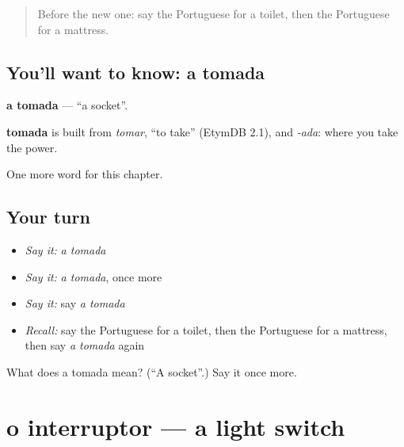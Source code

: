 \label{lesson:PT-C229-tomada}



\begin{quote}
Before the new one: say the Portuguese for a toilet, then the Portuguese for a mattress.
\end{quote}

\subsection*{You'll want to know: a tomada}
\textbf{a tomada} — \textquotedblleft{}a socket\textquotedblright{}.

\begin{cousinweb}
\textbf{tomada} is built from \emph{tomar}, \textquotedblleft{}to take\textquotedblright{} (EtymDB 2.1), and \emph{-ada}: where you take the power.
\end{cousinweb}

\begin{grammarlens}[title={What you've built}]
One more word for this chapter.
\end{grammarlens}

\subsection*{Your turn}
\begin{itemize}
\raggedright
  \item \emph{Say it:} \emph{a tomada}
  \item \emph{Say it:} \emph{a tomada}, once more
  \item \emph{Say it:} say \emph{a tomada}
  \item \emph{Recall:} say the Portuguese for a toilet, then the Portuguese for a mattress, then say \emph{a tomada} again
\end{itemize}

\begin{tcolorbox}[breakable,colback=teal!4,colframe=teal!35!black,title={Before you move on}]
What does a tomada mean? (\textquotedblleft{}A socket\textquotedblright{}.) Say it once more.
\end{tcolorbox}
\section[o interruptor]{o interruptor — a light switch}

\label{lesson:PT-C229-interruptor}



